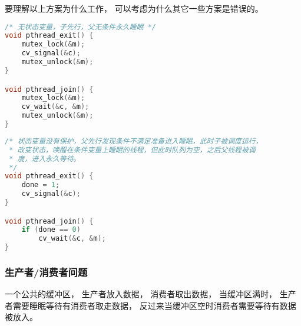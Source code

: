 要理解以上方案为什么工作，
可以考虑为什么其它一些方案是错误的。
\begin{lstlisting}[language=C]
/* 无状态变量，子先行，父无条件永久睡眠 */
void pthread_exit() {
	mutex_lock(&m);
	cv_signal(&c);
	mutex_unlock(&m);
}

void pthread_join() {
	mutex_lock(&m);
	cv_wait(&c, &m);
	mutex_unlock(&m);
}
\end{lstlisting}

\begin{lstlisting}[language=C]
/* 状态变量没有保护，父先行发现条件不满足准备进入睡眠，此时子被调度运行，
 * 改变状态，唤醒在条件变量上睡眠的线程，但此时队列为空，之后父线程被调
 * 度，进入永久等待。
 */
void pthread_exit() {
	done = 1;
	cv_signal(&c);
}

void pthread_join() {
	if (done == 0)
		cv_wait(&c, &m);
}
\end{lstlisting}

\subsubsection{生产者/消费者问题}
一个公共的缓冲区，
生产者放入数据，
消费者取出数据，
当缓冲区满时，
生产者需要睡眠等待有消费者取走数据，
反过来当缓冲区空时消费者需要等待有数据被放入。


